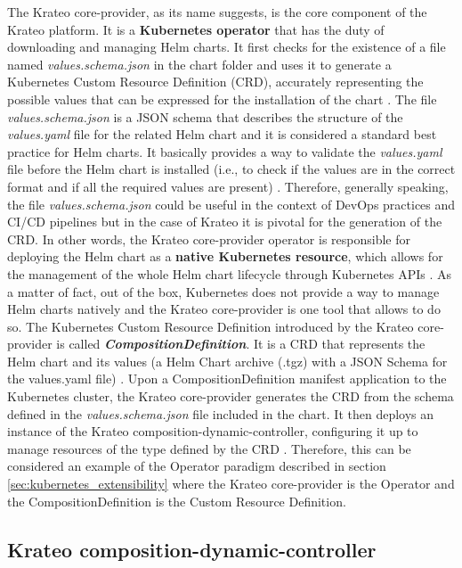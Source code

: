 The Krateo core-provider, as its name suggests, is the core component of the Krateo platform.
It is a \textbf{Kubernetes operator} that has the duty of downloading and managing Helm charts. 
It first checks for the existence of a file named \textit{values.schema.json} in the chart folder and uses it to generate a Kubernetes Custom Resource Definition (CRD), accurately representing the possible values that can be expressed for the installation of the chart \cite{krateo_core_provider}.
The file \textit{values.schema.json} is a JSON schema that describes the structure of the \textit{values.yaml} file for the related Helm chart and it is considered a standard best practice for Helm charts. 
It basically provides a way to validate the \textit{values.yaml} file before the Helm chart is installed (i.e., to check if the values are in the correct format and if all the required values are present) \cite{krateo_core_provider}.
Therefore, generally speaking, the file \textit{values.schema.json} could be useful in the context of DevOps practices and CI/CD pipelines but in the case of Krateo it is pivotal for the generation of the CRD.
In other words, the Krateo core-provider operator is responsible for deploying the Helm chart as a \textbf{native Kubernetes resource}, which allows for the management of the whole Helm chart lifecycle through Kubernetes APIs \cite{krateo_core_provider}.
As a matter of fact, out of the box, Kubernetes does not provide a way to manage Helm charts natively and the Krateo core-provider is one tool that allows to do so.
The Kubernetes Custom Resource Definition introduced by the Krateo core-provider is called \textbf{\textit{CompositionDefinition}}. 
It is a CRD that represents the Helm chart and its values (a Helm Chart archive (.tgz) with a JSON Schema for the values.yaml file) \cite{krateo_core_provider}.
Upon a CompositionDefinition manifest application to the Kubernetes cluster, the Krateo core-provider generates the CRD from the schema defined in the \textit{values.schema.json} file included in the chart. 
It then deploys an instance of the Krateo composition-dynamic-controller, configuring it up to manage resources of the type defined by the CRD \cite{krateo_core_provider}.
Therefore, this can be considered an example of the Operator paradigm described in section \ref{sec:kubernetes_extensibility} where the Krateo core-provider is the Operator and the CompositionDefinition is the Custom Resource Definition.

\subsection{Krateo composition-dynamic-controller}

